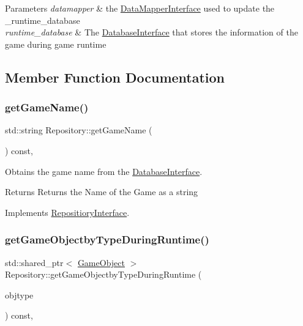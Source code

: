 \begin{DoxyParams}{Parameters}
{\em datamapper} & the \hyperlink{class_data_mapper_interface}{Data\+Mapper\+Interface} used to update the \+\_\+runtime\+\_\+database \\
\hline
{\em runtime\+\_\+database} & The \hyperlink{class_database_interface}{Database\+Interface} that stores the information of the game during game runtime \\
\hline
\end{DoxyParams}


\subsection{Member Function Documentation}
\mbox{\label{class_repository_a9bdfb4cab4ece2af1e45ef5ef06b9e49}} 
\subsubsection{\texorpdfstring{get\+Game\+Name()}{getGameName()}}
{\footnotesize\ttfamily std\+::string Repository\+::get\+Game\+Name (\begin{DoxyParamCaption}{ }\end{DoxyParamCaption}) const\hspace{0.3cm}{\ttfamily [override]}, {\ttfamily [virtual]}}



Obtains the game name from the \hyperlink{class_database_interface}{Database\+Interface}. 

\begin{DoxyReturn}{Returns}
Returns the Name of the Game as a string 
\end{DoxyReturn}


Implements \hyperlink{class_repositiory_interface_aa40617b92b721ec087dd69f3986e9efd}{Repositiory\+Interface}.

\mbox{\label{class_repository_ab239e9b04db0524e168d54201bcd7076}} 
\subsubsection{\texorpdfstring{get\+Game\+Objectby\+Type\+During\+Runtime()}{getGameObjectbyTypeDuringRuntime()}}
{\footnotesize\ttfamily std\+::shared\+\_\+ptr$<$ \hyperlink{class_game_object}{Game\+Object} $>$ Repository\+::get\+Game\+Objectby\+Type\+During\+Runtime (\begin{DoxyParamCaption}\item[{Game\+Object\+Type}]{objtype }\end{DoxyParamCaption}) const\hspace{0.3cm}{\ttfamily [override]}, {\ttfamily [virtual]}}



